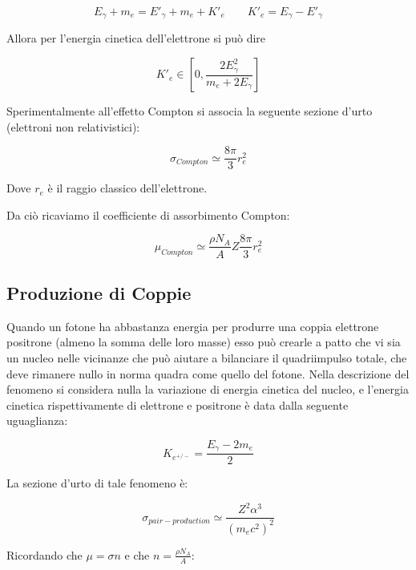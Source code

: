 \begin{equation}
E_{\gamma}+m_e=E'_{\gamma}+m_e+K'_e \qquad K'_e=E_{\gamma}-E'_{\gamma}
\end{equation}

Allora per l'energia cinetica dell'elettrone si può dire

\begin{equation}
K'_e \in [0, \frac{2E_{\gamma}^2}{m_e+2E_{\gamma}}]
\end{equation}

Sperimentalmente all'effetto Compton si associa la seguente sezione d'urto (elettroni non relativistici):

\begin{equation}
\sigma_{Compton}\simeq\frac{8\pi}{3}r_{e}^2
\end{equation}

Dove $r_{e}$ è il raggio classico dell'elettrone.

Da ciò ricaviamo il coefficiente di assorbimento Compton:

\begin{equation}
\mu_{Compton}\simeq\frac{\rho N_{A}}{A}Z\frac{8\pi}{3}r_{e}^2
\end{equation}

\subsection{Produzione di Coppie}

Quando un fotone ha abbastanza energia per produrre una coppia elettrone positrone (almeno la somma delle loro masse) esso può crearle a patto che vi sia un nucleo nelle vicinanze che può aiutare a bilanciare il quadriimpulso totale, che deve rimanere nullo in norma quadra come quello del fotone. 
Nella descrizione del fenomeno si considera nulla la variazione di energia cinetica del nucleo, e l'energia cinetica rispettivamente di elettrone e positrone è data dalla seguente uguaglianza:

\begin{equation}
K_{e^{+/-}}=\frac{E_{\gamma}-2m_e}{2}
\end{equation}

La sezione d'urto di tale fenomeno è:

\begin{equation}
\sigma_{pair-production}\simeq\frac{Z^2\alpha^3}{(m_ec^2)^2}
\end{equation}

Ricordando che $\mu=\sigma n$ e che $n=\frac{\rho N_A}{A}$:

